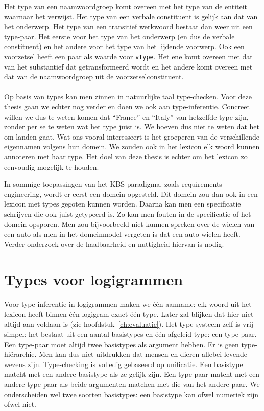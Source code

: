 Het type van een naamwoordgroep komt overeen met het type van de entiteit waarnaar het verwijst. Het type van een verbale constituent is gelijk aan dat van het onderwerp. Het type van een transitief werkwoord bestaat dan weer uit een type-paar. Het eerste voor het type van het onderwerp (en dus de verbale constituent) en het andere voor het type van het lijdende voorwerp. Ook een voorzetsel heeft een paar als waarde voor \texttt{vType}. Het ene komt overeen met dat van het substantief dat getransformeerd wordt en het andere komt overeen met dat van de naamwoordgroep uit de voorzetselconstituent.

\paragraph{} Op basis van types kan men zinnen in natuurlijke taal type-checken. Voor deze thesis gaan we echter nog verder en doen we ook aan type-inferentie. Concreet willen we dus te weten komen dat ``France'' en ``Italy'' van hetzelfde type zijn, zonder per se te weten wat het type juist is. We hoeven dus niet te weten dat het om landen gaat. Wat ons vooral interesseert is het groeperen van de verschillende eigennamen volgens hun domein. We zouden ook in het lexicon elk woord kunnen annoteren met haar type. Het doel van deze thesis is echter om het lexicon zo eenvoudig mogelijk te houden. 

In sommige toepassingen van het KBS-paradigma, zoals requirements engineering, wordt er eerst een domein opgesteld. Dit domein zou dan ook in een lexicon met types gegoten kunnen worden. Daarna kan men een specificatie schrijven die ook juist getypeerd is. Zo kan men fouten in de specificatie of het domein opsporen. Men zou bijvoorbeeld niet kunnen spreken over de wielen van een auto als men in het domeinmodel vergeten is dat een auto wielen heeft. Verder onderzoek over de haalbaarheid en nuttigheid hiervan is nodig.

\section{Types voor logigrammen}
\paragraph{} Voor type-inferentie in logigrammen maken we één aanname: elk woord uit het lexicon heeft binnen één logigram exact één type. Later zal blijken dat hier niet altijd aan voldaan is (zie hoofdstuk~\ref{ch:evaluatie}). Het type-systeem zelf is vrij simpel: het bestaat uit een aantal basistypes en één afgeleid type: een type-paar. Een type-paar moet altijd twee basistypes als argument hebben. Er is geen type-hiërarchie. Men kan dus niet uitdrukken dat mensen en dieren allebei levende wezens zijn. Type-checking is volledig gebaseerd op unificatie. Een basistype matcht met een andere basistype als ze gelijk zijn. Een type-paar matcht met een andere type-paar als beide argumenten matchen met die van het andere paar. We onderscheiden wel twee soorten basistypes: een basistype kan ofwel numeriek zijn ofwel niet. 


